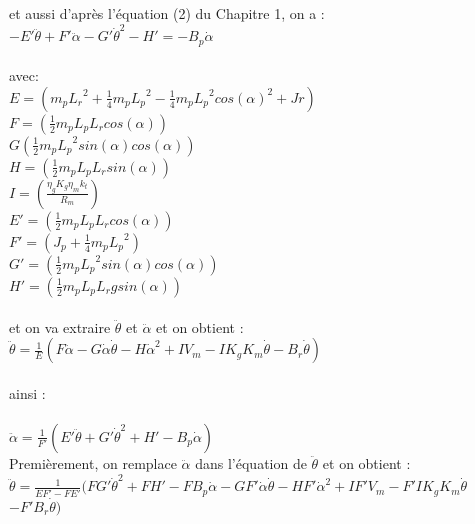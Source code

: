 \documentclass[12pt, a4paper, openany]{report}
\begin{document}
et aussi d'après l'équation (2) du Chapitre 1, on a :\\ 


$-{E}'\ddot{\theta}+{F}'\ddot{\alpha}-{G}'\dot{\theta}^2-{H}'=-B_{p}\dot{\alpha}$ \\\\

avec: \\

$E=(m_{p}{L_{r}}^2+\frac{1}{4}m_{p}{L_{p}}^2-\frac{1}{4}m_{p}{L_{p}}^2cos({\alpha})^2+Jr)$ \\

$F=(\frac{1}{2}m_{p}L_{p}L_{r}cos(\alpha))$\\

$G(\frac{1}{2}m_{p}{L_{p}}^2sin(\alpha)cos(\alpha))$\\

$H=(\frac{1}{2}m_{p}L_{p}L_{r}sin(\alpha))$\\

$I=(\frac{\eta_{g}K_{g}\eta_{m}k_{t}}{R_{m}})$\\

${E}'=(\frac{1}{2}m_{p}L_{p}L_{r}cos(\alpha))$\\

${F}'=(J_{p}+\frac{1}{4}m_{p}{L_{p}}^2)$\\

${G}'=(\frac{1}{2}m_{p}{L_{p}}^2sin(\alpha)cos(\alpha))$\\

${H}'=(\frac{1}{2}m_{p}L_{p}L_{r}gsin(\alpha))$\\\\

et on va extraire $\ddot{\theta }$ et $\ddot{\alpha}$ et on obtient :\\

 $\ddot{\theta }=\frac{1}{E}(F\ddot{\alpha}-G\dot{\alpha}\dot{\theta}-H\dot{\alpha}^2+IV_{m}-IK_{g}K_{m}\dot{\theta}-B_{r}\dot{\theta})$\\\\
   ainsi :\\\\
   $\ddot{\alpha}=\frac{1}{{F}'}({E}'\ddot{\theta}+{G}'\dot{\theta}^2+{H}'-B_{p}\dot{\alpha})$ \\


 Premièrement, on remplace $\ddot{\alpha}$ dans l'équation de $\ddot{\theta}$ et on obtient :\\ 


$\ddot{\theta}=\frac{1}{E{F}'-F{E}'}(F{G}'\dot{\theta}^2+F{H}'-FB_{p}\dot{\alpha}-G{F}'\dot{\alpha}\dot{\theta}-H{F}'\dot{\alpha}^2+I{F}'V_{m}-{F}'IK_{g}K_{m}\dot{\theta}$\\$-{F}'B_{r}\dot{\theta})$\\ 
\end{document}
